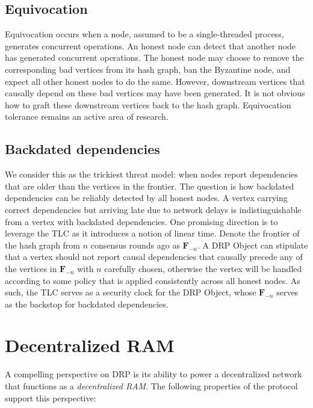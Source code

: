 \documentclass{article}
\begin{document}
\subsection {Equivocation}
Equivocation occurs when a node, assumed to be a single-threaded process, generates concurrent operations. An honest node can detect that another node has generated concurrent operations. The honest node may choose to remove the corresponding bad vertices from its hash graph, ban the Byzantine node, and expect all other honest nodes to do the same. However, downstream vertices that causally depend on these bad vertices may have been generated. It is not obvious how to graft these downstream vertices back to the hash graph. Equivocation tolerance remains an active area of research.

\subsection {Backdated dependencies}
We consider this as the trickiest threat model: when nodes report dependencies that are older than the vertices in the frontier. The question is how backdated dependencies can be reliably detected by all honest nodes. A vertex carrying correct dependencies but arriving late due to network delays is indistinguishable from a vertex with backdated dependencies. One promising direction is to leverage the TLC as it introduces a notion of linear time. Denote the frontier of the hash graph from $n$ consensus rounds ago as $\textbf{F}_{-n}$. A DRP Object can stipulate that a vertex should not report causal dependencies that causally precede any of the vertices in $\textbf{F}_{-n}$ with $n$ carefully chosen, otherwise the vertex will be handled according to some policy that is applied consistently across all honest nodes. As such, the TLC serves as a security clock for the DRP Object, whose $\textbf{F}_{-n}$ serves as the backstop for backdated dependencies.

\section{Decentralized RAM}
\label{sec:headings}

A compelling perspective on DRP is its ability to power a decentralized network that functions as a \textit{decentralized RAM}. The following properties of the protocol support this perspective:
\end{document}
